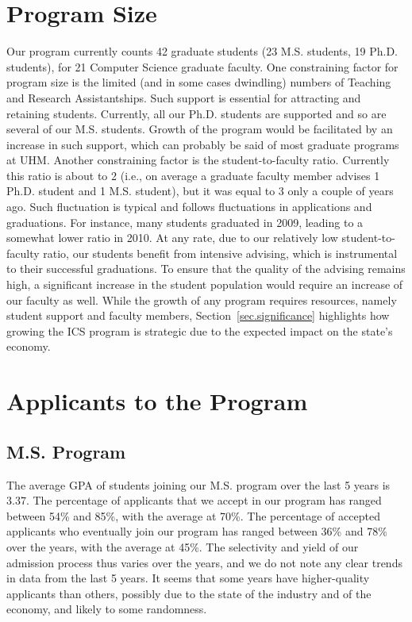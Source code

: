 \documentclass[12pt]{article}
\begin{document}


\section{Program Size}
\label{sec.size}

Our program currently counts 42 graduate students (23 M.S. students,
19 Ph.D. students), for 21 Computer Science graduate faculty.  One
constraining factor for program size is the limited (and in some cases
dwindling) numbers of Teaching and Research Assistantships. Such
support is essential for attracting and retaining students.
Currently, all our Ph.D. students are supported and so are several of
our M.S. students. Growth of the program would be facilitated by an
increase in such support, which can probably be said of most graduate
programs at UHM.  Another constraining factor is the
student-to-faculty ratio. Currently this ratio is about to 2 (i.e., on
average a graduate faculty member advises 1 Ph.D. student and 1 M.S.
student), but it was equal to 3 only a couple of years ago. Such
fluctuation is typical and follows fluctuations in applications and
graduations. For instance, many students graduated in 2009, leading to
a somewhat lower ratio in 2010.  At any rate, due to our relatively
low student-to-faculty ratio, our students benefit from intensive
advising, which is instrumental to their successful graduations.  To
ensure that the quality of the advising remains high, a significant
increase in the student population would require an increase of our
faculty as well. While the growth of any program requires resources,
namely student support and faculty members,
Section~\ref{sec.significance} highlights how growing the ICS program
is strategic due to the expected impact on the state's economy.



\section{Applicants to the Program}
\label{sec.apps}

\subsection{M.S. Program}
\label{sec.apps.ms}

The average GPA of students joining our M.S. program over the last 5
years is 3.37. The percentage of applicants that we accept in our
program has ranged between 54\% and 85\%, with the average at 70\%.
The percentage of accepted applicants who eventually join our program
has ranged between 36\% and 78\% over the years, with the average at
45\%. The selectivity and yield of our admission process thus varies
over the years, and we do not note any clear trends in data from
the last 5 years. It seems that some years have higher-quality
applicants than others, possibly due to the state of the industry and
of the economy, and likely to some randomness.
\end{document}
